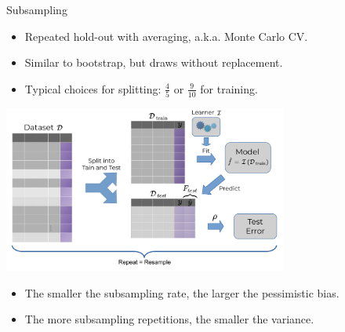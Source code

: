 \begin{vbframe}{Subsampling}

\begin{itemize}
  \item Repeated hold-out with averaging, a.k.a. Monte Carlo CV.
  \item Similar to bootstrap, but draws without replacement.
  \item Typical choices for splitting: $\frac{4}{5}$ or $\frac{9}{10}$ for 
  training.
\end{itemize}
\begin{center}
\includegraphics[width=0.7\textwidth]{figure_man/resampling_error.pdf}
\end{center}
\begin{itemize}
  \item The smaller the subsampling rate, the larger the pessimistic bias.
  \item The more subsampling repetitions, the smaller the variance.
\end{itemize}

\end{vbframe}

